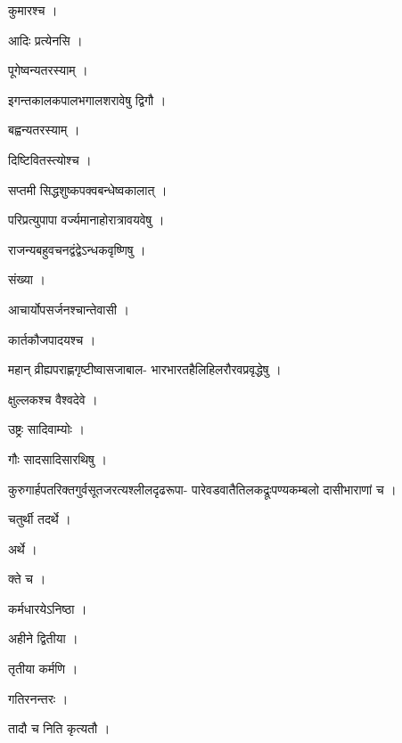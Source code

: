 \documentclass[10pt, openany]{book}
\begin{document}
\noindent कुमारश्च ।

\noindent आदिः प्रत्येनसि ।

\noindent पूगेष्वन्यतरस्याम् ।

\noindent इगन्तकालकपालभगालशरावेषु द्विगौ ।

\noindent बह्वन्यतरस्याम् ।

\noindent दिष्टिवितस्त्योश्च ।

\noindent सप्तमी सिद्धशुष्कपक्वबन्धेष्वकालात् ।

\noindent परिप्रत्युपापा वर्ज्यमानाहोरात्रावयवेषु ।

\noindent राजन्यबहुवचनद्वंद्वेऽन्धकवृष्णिषु ।

\noindent संख्या ।

\noindent आचार्योपसर्जनश्चान्तेवासी ।

\noindent कार्तकौजपादयश्च ।

\noindent महान् व्रीह्यपराह्णगृष्टीष्वासजाबाल- भारभारतहैलिहिलरौरवप्रवृद्धेषु ।

\noindent क्षुल्लकश्च वैश्वदेवे ।

\noindent उष्ट्रः सादिवाम्योः ।

\noindent गौः सादसादिसारथिषु ।

\noindent कुरुगार्हपतरिक्तगुर्वसूतजरत्यश्लीलदृढरूपा- पारेवडवातैतिलकद्रूःपण्यकम्बलो दासीभाराणां च ।

\noindent चतुर्थी तदर्थे ।

\noindent अर्थे ।

\noindent क्ते च ।

\noindent कर्मधारयेऽनिष्ठा ।

\noindent अहीने द्वितीया ।

\noindent तृतीया कर्मणि ।

\noindent गतिरनन्तरः ।

\noindent तादौ च निति कृत्यतौ ।
\end{document}
